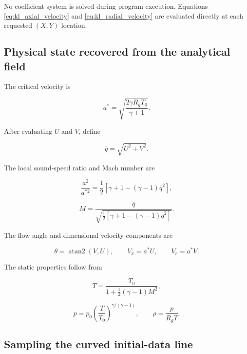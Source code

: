 No coefficient system is solved during program execution.  Equations
\eqref{eq:kl_axial_velocity} and \eqref{eq:kl_radial_velocity} are evaluated
directly at each requested \((X,Y)\) location.

\subsection{Physical state recovered from the analytical field}

The critical velocity is

\begin{equation}
    a^*=\sqrt{\frac{2\gamma R_gT_0}{\gamma+1}}.
\end{equation}

After evaluating \(U\) and \(V\), define

\begin{equation}
    \overline q=\sqrt{U^2+V^2}.
\end{equation}

The local sound-speed ratio and Mach number are

\begin{equation}
    \frac{a^2}{a^{*2}}
    =\frac12\left[\gamma+1-(\gamma-1)\overline q^2\right],
\end{equation}

\begin{equation}
    \boxed{
    M=\frac{\overline q}
    {\sqrt{\frac12[\gamma+1-(\gamma-1)\overline q^2]}}
    }.
\end{equation}

The flow angle and dimensional velocity components are

\begin{equation}
    \theta=\operatorname{atan2}(V,U),
    \qquad
    V_x=a^*U,
    \qquad
    V_r=a^*V.
\end{equation}

The static properties follow from

\begin{equation}
    T=\frac{T_0}{1+\frac12(\gamma-1)M^2},
\end{equation}

\begin{equation}
    p=p_0\left(\frac{T}{T_0}\right)^{\gamma/(\gamma-1)},
    \qquad
    \rho=\frac{p}{R_gT}.
\end{equation}

\subsection{Sampling the curved initial-data line}

